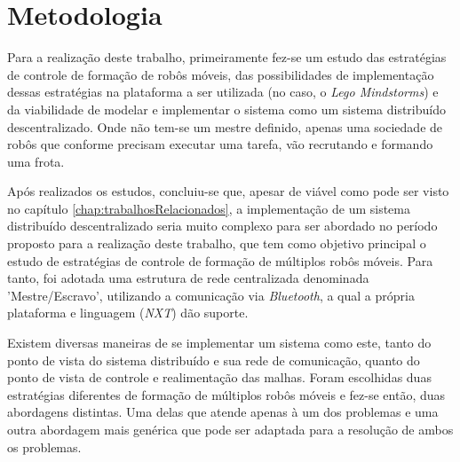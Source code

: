 %
%
\chapter{Metodologia}
\label{chap:Metod}
Para a realização deste trabalho, primeiramente fez-se um estudo das estratégias de controle de formação de robôs móveis, das possibilidades %
de implementação dessas estratégias na plataforma a ser utilizada (no caso, o \emph{Lego Mindstorms\textregistered}) e da viabilidade de modelar e implementar o sistema como um sistema distribuído descentralizado. Onde não tem-se um mestre definido, apenas uma sociedade de robôs que conforme precisam executar uma tarefa, vão recrutando e formando uma frota. 

Após realizados os estudos, concluiu-se que, apesar de viável como pode ser visto no capítulo \ref{chap:trabalhosRelacionados}, a implementação de um sistema distribuído descentralizado seria muito complexo para ser abordado no período proposto para a realização deste trabalho, que tem como objetivo principal o estudo de estratégias de controle de formação de múltiplos robôs móveis. Para tanto, foi adotada uma estrutura de rede centralizada denominada 'Mestre/Escravo', utilizando a comunicação via \emph{Bluetooth}, a qual a própria plataforma e linguagem (\emph{NXT}) dão suporte. 


Existem diversas maneiras de se implementar um sistema como este, tanto do ponto de vista do sistema distribuído e sua rede de comunicação, quanto do ponto de vista de controle e realimentação das malhas. Foram escolhidas duas estratégias diferentes de formação de múltiplos robôs móveis e fez-se então, duas abordagens distintas. Uma delas que atende apenas à um dos problemas e uma outra abordagem mais genérica que pode ser adaptada para a resolução de ambos os problemas. 

